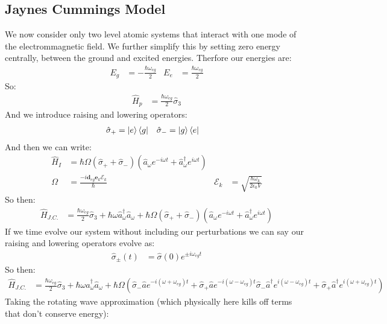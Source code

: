 \subsection{Jaynes Cummings Model}
We now consider only two level atomic systems that interact with one mode of the electrommagnetic field.
We further simplify this by setting zero energy centrally, between the ground and excited energies. Therfore our energies are:
\begin{align*}
	E_g &= -\frac{\hbar\omega_{eg}}{2} & E_e &= \frac{\hbar\omega_{eg}}{2}
\end{align*}
So:
\begin{align*}
	\hat{H}_p &= \frac{\hbar\omega_{eg}}{2}\hat{\sigma}_3
\end{align*}
And we introduce raising and lowering operators:
\begin{align*}
	\hat{\sigma}_+ &= \ket{e}\bra{g} & \hat{\sigma}_- &= \ket{g}\bra{e}
\end{align*}
And then we can write:
\begin{align*}
	\hat{H}_I &= \hbar\Omega(\hat{\sigma}_+ +\hat{\sigma}_-)(\hat{a}_\omega e^{-i\omega t} + \hat{a}_\omega^\dagger e^{i\omega t}) \\
	\Omega &= \frac{-i\bm{d}_{eg} \bm{e}_k \mathcal{E}_k}{\hbar} & \mathcal{E}_k &= \sqrt{\frac{\hbar\omega_k}{2\epsilon_0 V}}
\end{align*}
So then:
\begin{align*}
	\hat{H}_{J.C.} &= \frac{\hbar\omega_{eg}}{2} \hat{\sigma}_3 + \hbar\omega\hat{a}_\omega^\dagger\hat{a}_\omega + \hbar\Omega(\hat{\sigma}_+ + \hat{\sigma}_-)(\hat{a}_\omega e^{-i\omega t} + \hat{a}_\omega^\dagger e^{i\omega t})
\end{align*}
If we time evolve our system without including our perturbations we can say our raising and lowering operators evolve as:
\begin{align*}
	\hat{\sigma}_\pm(t) &= \hat{\sigma}(0) e^{\pm i\omega_{eg} t}
\end{align*}
So then:
\begin{align*}
	\hat{H}_{J.C.} &= \frac{\hbar\omega_{eg}}{2} \hat{\sigma}_3 + \hbar\omega\hat{a}_\omega^\dagger\hat{a}_\omega + \hbar\Omega\left(\hat{\sigma}_- \hat{a}e^{-i(\omega + \omega_{eg})t} + \hat{\sigma}_+\hat{a} e^{-i(\omega - \omega_{eg})t}
		\hat{\sigma}_-\hat{a}^\dagger e^{i(\omega - \omega_{eg})t} + \hat{\sigma}_+\hat{a}^\dagger e^{i(\omega + \omega_{eg})t}\right)
\end{align*}
Taking the rotating wave approximation (which physically here kills off terms that don't conserve energy):
